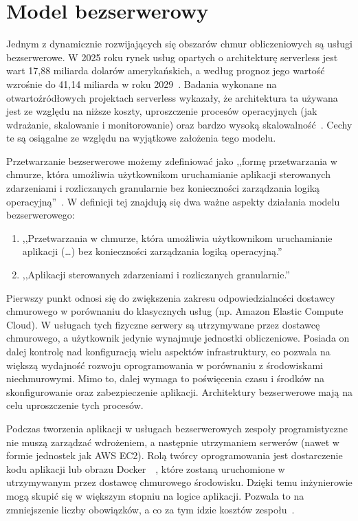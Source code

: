 \section{Model bezserwerowy}\label{chapter:model_serverless}
Jednym z dynamicznie rozwijających się obszarów chmur obliczeniowych są usługi bezserwerowe. 
W 2025 roku rynek usług opartych o architekturę serverless jest wart 17,88 miliarda dolarów amerykańskich, 
a według prognoz jego wartość wzrośnie do 41,14 miliarda w roku 2029~\cite{serverlessArchitectureMarketReport}. 
Badania wykonane na otwartoźródłowych projektach serverless wykazały, 
że architektura ta używana jest ze względu na niższe koszty, uproszczenie procesów operacyjnych (jak wdrażanie, skalowanie i monitorowanie) 
oraz bardzo wysoką skalowalność~\cite{ServerlessApplicationsWhyWhenAndHow}. 
Cechy te są osiągalne ze względu na wyjątkowe założenia tego modelu.

Przetwarzanie bezserwerowe możemy zdefiniować jako 
,,formę przetwarzania w chmurze, która umożliwia użytkownikom uruchamianie aplikacji sterowanych zdarzeniami i rozliczanych granularnie bez konieczności zarządzania logiką operacyjną''~\cite{SpecRgCloudGroupVisionOnThePerformanceChallengesOfFaas}.
W definicji tej znajdują się dwa ważne aspekty działania modelu bezserwerowego:

\begin{enumerate}
    \item ,,Przetwarzania w chmurze, która umożliwia użytkownikom uruchamianie aplikacji (\dots) bez konieczności zarządzania logiką operacyjną.''
    \item ,,Aplikacji sterowanych zdarzeniami i rozliczanych granularnie.''
\end{enumerate}

Pierwszy punkt odnosi się do zwiększenia zakresu odpowiedzialności dostawcy chmurowego w porównaniu do klasycznych usług (np. Amazon Elastic Compute Cloud). 
W usługach tych fizyczne serwery są utrzymywane przez dostawcę chmurowego, a użytkownik jedynie wynajmuje jednostki obliczeniowe. 
Posiada on dalej kontrolę nad konfiguracją wielu aspektów infrastruktury, co pozwala na większą wydajność rozwoju oprogramowania w porównaniu z środowiskami niechmurowymi. 
Mimo to, dalej wymaga to poświęcenia czasu i środków na skonfigurowanie oraz zabezpieczenie aplikacji. 
Architektury bezserwerowe mają na celu uproszczenie tych procesów.

Podczas tworzenia aplikacji w usługach bezserwerowych zespoły programistyczne nie muszą zarządzać wdrożeniem, a następnie utrzymaniem serwerów (nawet w formie jednostek jak AWS EC2). 
Rolą twórcy oprogramowania jest dostarczenie kodu aplikacji lub obrazu Docker~\cite{awsLambdaDocs}~\cite{awsEcsDevGuide}, które zostaną uruchomione w utrzymywanym przez dostawcę chmurowego środowisku. 
Dzięki temu inżynierowie mogą skupić się w większym stopniu na logice aplikacji. 
Pozwala to na zmniejszenie liczby obowiązków, a co za tym idzie kosztów zespołu~\cite{riseOfThePlanetOfServerlessComputing}. 


